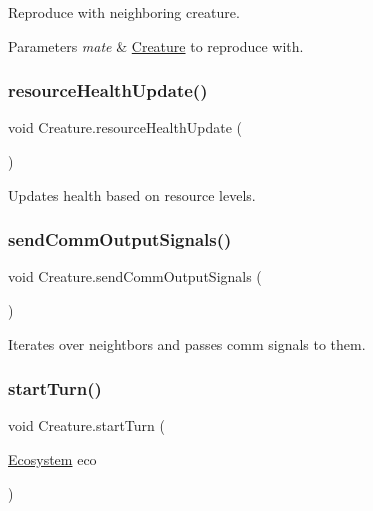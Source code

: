 Reproduce with neighboring creature. 


\begin{DoxyParams}{Parameters}
{\em mate} & \mbox{\hyperlink{class_creature}{Creature}} to reproduce with.\\
\hline
\end{DoxyParams}
\mbox{\label{class_creature_afa20bf76dd7678a5e60b75e2dadaa6ac}} 
\subsubsection{\texorpdfstring{resource\+Health\+Update()}{resourceHealthUpdate()}}
{\footnotesize\ttfamily void Creature.\+resource\+Health\+Update (\begin{DoxyParamCaption}{ }\end{DoxyParamCaption})}



Updates health based on resource levels. 

\mbox{\label{class_creature_ab103ada400a5773ae0d34c11b3abf2d4}} 
\subsubsection{\texorpdfstring{send\+Comm\+Output\+Signals()}{sendCommOutputSignals()}}
{\footnotesize\ttfamily void Creature.\+send\+Comm\+Output\+Signals (\begin{DoxyParamCaption}{ }\end{DoxyParamCaption})}



Iterates over neightbors and passes comm signals to them. 

\mbox{\label{class_creature_a84d61b231641c1af50195151ab904ada}} 
\subsubsection{\texorpdfstring{start\+Turn()}{startTurn()}}
{\footnotesize\ttfamily void Creature.\+start\+Turn (\begin{DoxyParamCaption}\item[{\mbox{\hyperlink{class_ecosystem}{Ecosystem}}}]{eco }\end{DoxyParamCaption})}




